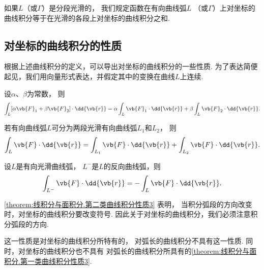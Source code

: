 如果\(L\)（或\(\Gamma\)）是分段光滑的，
我们规定函数在有向曲线弧\(L\)
（或\(\Gamma\)）上对坐标的曲线积分等于在光滑的各段上对坐标的曲线积分之和.

\subsection{对坐标的曲线积分的性质}
根据上述曲线积分的定义，可以导出对坐标的曲线积分的一些性质.
为了表达简便起见，我们用向量形式表达，并假定其中的变换在曲线\(L\)上连续.

\begin{property}\label{theorem:线积分与面积分.第二类曲线积分性质1}
设\(\alpha\)、\(\beta\)为常数，
则\[
	\int_L [\alpha \vb{F}_1 + \beta \vb{F}_2] \cdot \dd{\vb{r}}
	= \alpha \int_L \vb{F}_1 \cdot \dd{\vb{r}}
	+ \beta \int_L \vb{F}_2 \cdot \dd{\vb{r}}.
\]
\end{property}

\begin{property}\label{theorem:线积分与面积分.第二类曲线积分性质2}
若有向曲线弧\(L\)可分为两段光滑有向曲线弧\(L_1\)和\(L_2\)，
则\[
	\int_L \vb{F} \cdot \dd{\vb{r}}
	= \int_{L_1} \vb{F} \cdot \dd{\vb{r}}
	+ \int_{L_2} \vb{F} \cdot \dd{\vb{r}}.
\]
\end{property}

\begin{property}\label{theorem:线积分与面积分.第二类曲线积分性质3}
设\(L\)是有向光滑曲线弧，
\(L^-\)是\(L\)的反向曲线弧，则\[
	\int_{L^-} \vb{F} \cdot \dd{\vb{r}}
	= - \int_L \vb{F} \cdot \dd{\vb{r}}.
\]
\end{property}
\cref{theorem:线积分与面积分.第二类曲线积分性质3} 表明，
当积分弧段的方向改变时，对坐标的曲线积分要改变符号.
因此关于对坐标的曲线积分，我们必须注意积分弧段的方向.

这一性质是对坐标的曲线积分所特有的，
对弧长的曲线积分不具有这一性质.
同时，对坐标的曲线积分也不具有
对弧长的曲线积分所具有的\cref{theorem:线积分与面积分.第一类曲线积分性质3}.

